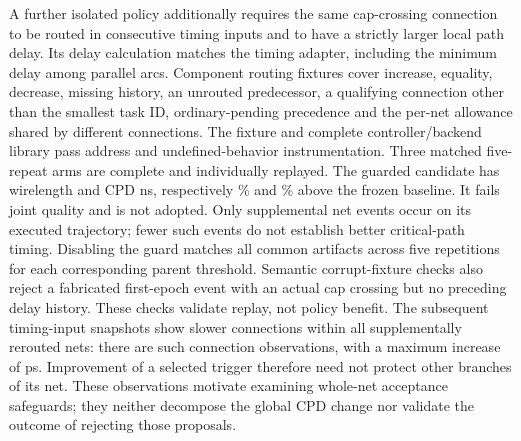 \documentclass[10pt]{article}
\begin{document}
A further isolated policy additionally requires the same cap-crossing
connection to be routed in consecutive timing inputs and to have a strictly
larger local path delay. Its delay calculation matches the timing adapter,
including the minimum delay among parallel arcs. Component routing fixtures
cover increase, equality, decrease, missing history, an unrouted predecessor,
a qualifying connection other than the smallest task ID, ordinary-pending
precedence and the per-net allowance shared by different connections.
The fixture and complete controller/backend library pass address and
undefined-behavior instrumentation. Three matched five-repeat arms are complete and individually replayed.
The guarded candidate has wirelength \LocalGuardWL{} and CPD
\LocalGuardCPD{} ns, respectively \LocalGuardWLDelta{}\% and
\LocalGuardCPDDelta{}\% above the frozen baseline. It fails joint quality
and is not adopted. Only \LocalGuardSupplemental{} supplemental net events
occur on its executed trajectory; fewer such events do not establish better
critical-path timing. Disabling the guard matches all
\LocalGuardCompatibleArtifacts{} common artifacts across five repetitions
for each corresponding parent threshold. Semantic corrupt-fixture checks
also reject a fabricated first-epoch event with an actual cap crossing but
no preceding delay history. These checks validate replay, not policy benefit.
The subsequent timing-input snapshots show slower connections within all
\LocalGuardSlowerEvents{} supplementally rerouted nets: there are
\LocalGuardSlowerConnections{} such connection observations, with a maximum
increase of \LocalGuardMaxIncrease{} ps. Improvement of a selected trigger
therefore need not protect other branches of its net. These observations
motivate examining whole-net acceptance safeguards; they neither decompose
the global CPD change nor validate the outcome of rejecting those proposals.
\end{document}
